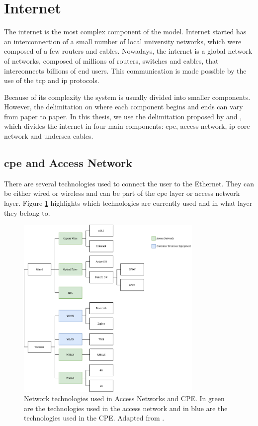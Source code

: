 \section{Internet}

The internet is the most complex component of the model.
Internet started has an interconnection of a small number of local university networks, which were composed of a few routers and cables. Nowadays, the internet is a global network of networks, composed of millions of routers, switches and cables, that interconnects billions of end users. This communication is made possible by the use of the \ac{tcp} and \ac{ip} protocols.

Because of its complexity the system is usually divided into smaller components. However, the delimitation on where each component begins and ends can vary from paper to paper. In this thesis, we use the delimitation proposed by \citet{Coroama2015} and \citet{Schien2015}, which divides the internet in four main components: \ac{cpe}, access network, \ac{ip} core network and undersea cables.

\subsection{\acl{cpe} and Access Network}

There are several technologies used to connect the user to the Ethernet. They can be either wired or wireless and can be part of the \ac{cpe} layer or access network layer. Figure \ref{figure:network_technologies} highlights which technologies are currently used and in what layer they belong to.

\begin{figure}[h]
    \centering
    \includegraphics[width=0.8\textwidth]{figs/network_technologies.png}
    \caption[Network technologies used in Access Networks and CPE]{Network technologies used in Access Networks and CPE. In green are the technologies used in the access network and in blue are the technologies used in the CPE. Adapted from \citet{forum:huawei}.}
    \label{figure:network_technologies}
\end{figure}

